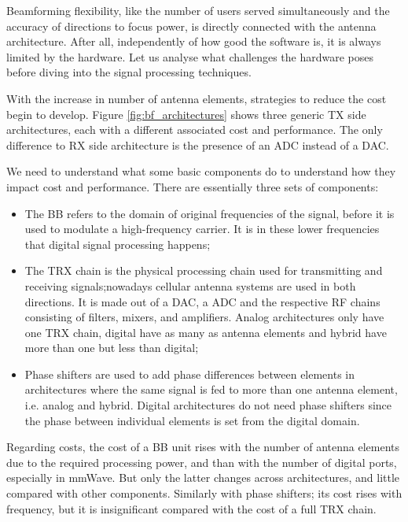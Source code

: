 Beamforming flexibility, like the number of users served simultaneously and the accuracy of directions to focus power, is directly connected with the antenna architecture. After all, independently of how good the software is, it is always limited by the hardware. Let us analyse what challenges the hardware poses before diving into the signal processing techniques.

With the increase in number of antenna elements, strategies to reduce the cost begin to develop. Figure 
\ref{fig:bf_architectures} shows three generic TX side architectures, each with a different associated cost and performance. The only difference to \acs{RX} side architecture is the presence of an \ac{ADC} instead of a \ac{DAC}. 


We need to understand what some basic components do to understand how they impact cost and performance. There are essentially three sets of components:

\begin{itemize}%
    \item The \ac{BB} refers to the domain of original frequencies of the signal, before it is used to modulate a high-frequency carrier. It is in these lower frequencies that digital signal processing happens;
    \item The \ac{TRX} chain is the physical processing chain used for transmitting and receiving signals;nowadays cellular antenna systems are used in both directions. It is made out of a \ac{DAC}, a \ac{ADC} and the respective \ac{RF} chains consisting of filters, mixers, and amplifiers. Analog architectures only have one TRX chain, digital have as many as antenna elements and hybrid have more than one but less than digital;
    \item Phase shifters are used to add phase differences between elements in architectures where the same signal is fed to more than one antenna element, i.e. analog and hybrid. Digital architectures do not need phase shifters since the phase between individual elements is set from the digital domain. 
\end{itemize}

Regarding costs, the cost of a BB unit rises with the number of antenna elements due to the required processing power, and than with the number of digital ports, especially in mmWave. But only the latter changes across architectures, and little compared with other components. Similarly with phase shifters; its cost rises with frequency, but it is insignificant compared with the cost of a full \ac{TRX} chain.

